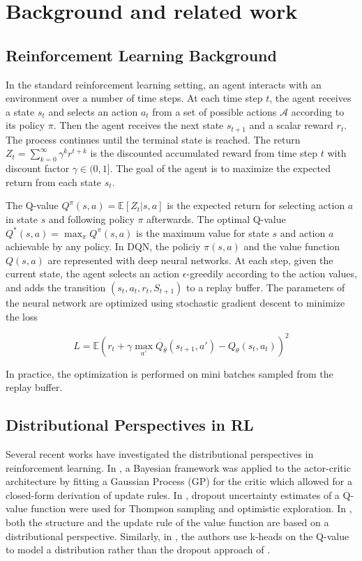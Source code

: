 \documentclass[a4paper,12pt]{article}
\begin{document}
\section{Background and related work}
\subsection{Reinforcement Learning Background}
In the standard reinforcement learning setting, an agent interacts with an environment over a number of time steps. At each time step $t$, the agent receives a state $s_t$ and selects an action $a_t$ from a set of possible actions $\mathcal{A}$ according to its policy $\pi$. Then the agent receives the next state $s_{t+1}$ and a scalar reward $r_t$. The process continues until the terminal state is reached. The return $Z_t = \sum_{k=0}^\infty \gamma^kr^{t+k}$ is the discounted accumulated reward from time step $t$ with discount factor $\gamma \in (0, 1]$. The goal of the agent is to maximize the expected return from each state $s_t$. 

The Q-value $Q^{\pi}(s, a) = \mathbb{E}[Z_t|s, a]$ is the expected return for selecting action $a$ in state $s$ and following policy $\pi$ afterwards. The optimal Q-value $Q^*(s,a) =\max_\pi Q^\pi(s,a)$ is the maximum value for state $s$ and action $a$ achievable by any policy. In DQN, the policiy $\pi(s, a)$ and the value function $Q(s, a)$ are represented with deep neural networks. At each step, given the current state, the agent selects an action $\epsilon$-greedily according to the action values, and adds the transition $(s_t , a_t , r_t, S_{t+1})$ to a replay buffer. The parameters of the neural network are optimized using stochastic gradient descent to minimize the loss

\begin{equation}
L = \mathbb{E}(r_t +\gamma \max_{a'}Q_{\bar{\theta}}(s_{t+1},a')-Q_\theta(s_t,a_t))^2
\end{equation}

In practice, the optimization is performed on mini batches sampled from the replay buffer. 

\subsection{Distributional Perspectives in RL}
Several recent works have investigated the distributional perspectives in reinforcement learning. In \cite{BAC}, a Bayesian framework was applied to the actor-critic architecture by fitting a Gaussian Process (GP) for the critic which allowed for a closed-form derivation of update rules. In \cite{Dropout}, dropout uncertainty estimates of a Q-value function were used for Thompson sampling and optimistic exploration. In \cite{DisDQN}, both the structure and the update rule of the value function are based on a distributional perspective. Similarly, in \cite{BDQN}, the authors use k-heads on the Q-value to model a distribution rather than the dropout approach of \cite{Dropout}. 
\end{document}
